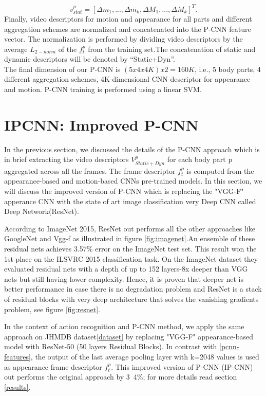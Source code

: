 \documentclass[10pt,twocolumn,letterpaper]{article}
\begin{document}
\begin{equation} \label{eq3}
v^{p}_{stat} = [\Delta m_{1},...,\Delta m_{k},\Delta M_{1},...,\Delta M_{k}]^{T}.
\end{equation}
Finally, video descriptors for motion and appearance for all
parts and different aggregation schemes are normalized and
concatenated into the P-CNN feature vector. The normalization
is performed by dividing video descriptors by the
average $L_{2-norm}$ of the $f^{p}_{t}$ from the training set.The concatenation of static and dynamic descriptors will be denoted by “Static+Dyn”.\\
The final dimension of our P-CNN is $(5x4x4K)x 2 = 160K$, i.e., 5 body parts, 4 different aggregation schemes, 4K-dimensional CNN descriptor for appearance and motion. P-CNN training is performed using a linear SVM.
\section{IPCNN: Improved P-CNN}
\label{ipcnn}
In the previous section, we discussed the details of the P-CNN approach which is in brief extracting the video descriptors $V^{p}_{Static+Dyn}$ for each body part p aggregated across all the frames. The frame descriptor $f^{p}_{t}$ is computed from the appearance-based and motion-based CNNs pre-trained models. In this section, we will discuss the improved version of P-CNN which is replacing the "VGG-F" apperance CNN with the state of art image classification very Deep CNN called Deep Network(ResNet)\cite{he2015deep}.

According to ImageNet 2015, ResNet out performs all the other approaches like GoogleNet\cite{szegedy2015going} and Vgg-f as illustrated in figure \ref{fig:imagenet}.An ensemble of these residual nets achieves 3.57\% error on the ImageNet test set. This result won the 1st place on the ILSVRC 2015 classification task. On the ImageNet dataset they evaluated residual nets with a depth of up to 152 layers-8x deeper than VGG nets but still having lower complexity. Hence, it is proven that deeper net is better performance in case there is no degradation problem and ResNet is a stack of residual blocks with very deep architecture that solves the vanishing gradients problem, see figure \ref{fig:resnet}.

In the context of action recognition and P-CNN method, we apply the same approach on JHMDB dataset\ref*{dataset} by replacing "VGG-F" appearance-based model with ResNet-50 (50 layers Residual Blocks). In contrast with \ref{pcnn-features}, the output of the last average pooling layer with k=2048 values is used as appearance frame descriptor $f^{p}_{t}$. This improved version of P-CNN (IP-CNN) out performs the original approach by 3~4\%; for more details read section \ref{results}.
\end{document}
